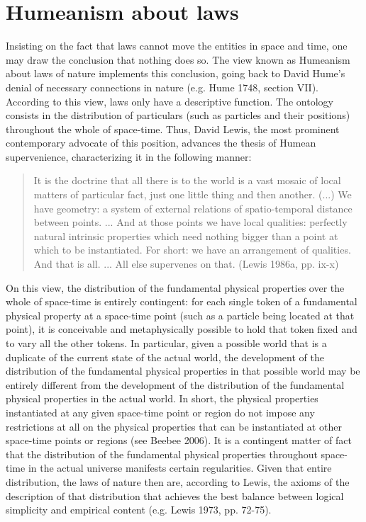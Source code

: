 \documentclass[12pt]{article}
\theoremstyle{definition}
\begin{document}
\section{Humeanism about laws}
Insisting on the fact that laws cannot move the entities in space and time, one may draw the conclusion that nothing does so. The view known as Humeanism about laws of nature implements this conclusion, going back to David Hume's denial of necessary connections in nature (e.g. Hume 1748, section VII). According to this view, laws only have a descriptive function. The ontology consists in the distribution of particulars (such as particles and their positions) throughout the whole of space-time. Thus, David Lewis, the most prominent contemporary advocate of this position, advances the thesis of Humean supervenience, characterizing it in the following manner:

\begin{quote} It is the doctrine that all there is to the world is a vast mosaic of local matters of particular fact, just one little thing and then another. (...) We have geometry: a system of external relations of spatio-temporal distance between points. ... And at those points we have local qualities: perfectly natural intrinsic properties which need nothing bigger than a point at which to be instantiated. For short: we have an arrangement of qualities. And that is all. ... All else supervenes on that. (Lewis 1986a, pp. ix-x)\end{quote}

\noindent On this view, the distribution of the fundamental physical properties over the whole of space-time is entirely contingent: for each single token of a fundamental physical property at a space-time point (such as a particle being located at that point), it is conceivable and metaphysically possible to hold that token fixed and to vary all the other tokens. In particular, given a possible world that is a duplicate of the current state of the actual world, the development of the distribution of the fundamental physical properties in that possible world may be entirely different from the development of the distribution of the fundamental physical properties in the actual world. In short, the physical properties instantiated at any given space-time point or region do not impose any restrictions at all on the physical properties that can be instantiated at other space-time points or regions (see Beebee 2006). It is a contingent matter of fact that the distribution of the fundamental physical properties throughout space-time in the actual universe manifests certain regularities. Given that entire distribution, the laws of nature then are, according to Lewis, the axioms of the description of that distribution that achieves the best balance between logical simplicity and empirical content (e.g. Lewis 1973, pp. 72-75).
\end{document}
